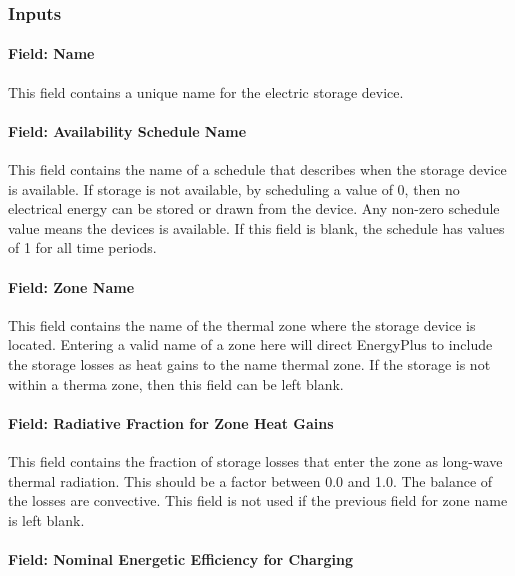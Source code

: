 \subsubsection{Inputs}\label{inputs-6-007}

\paragraph{Field: Name}\label{field-name-6-005}

This field contains a unique name for the electric storage device.

\paragraph{Field: Availability Schedule Name}\label{field-availability-schedule-name-5-000}

This field contains the name of a schedule that describes when the storage device is available. If storage is not available, by scheduling a value of 0, then no electrical energy can be stored or drawn from the device. Any non-zero schedule value means the devices is available. If this field is blank, the schedule has values of 1 for all time periods.

\paragraph{Field: Zone Name}\label{field-zone-name-5-000}

This field contains the name of the thermal zone where the storage device is located. Entering a valid name of a zone here will direct EnergyPlus to include the storage losses as heat gains to the name thermal zone. If the storage is not within a therma zone, then this field can be left blank.

\paragraph{Field: Radiative Fraction for Zone Heat Gains}\label{field-radiative-fraction-for-zone-heat-gains}

This field contains the fraction of storage losses that enter the zone as long-wave thermal radiation. This should be a factor between 0.0 and 1.0. The balance of the losses are convective. This field is not used if the previous field for zone name is left blank.

\paragraph{Field: Nominal Energetic Efficiency for Charging}\label{field-nominal-energetic-efficiency-for-charging}

